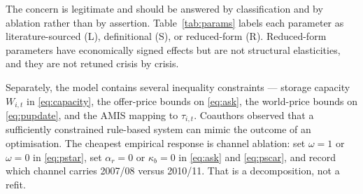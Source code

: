 The concern is legitimate and should be answered by classification and by
ablation rather than by assertion. Table~\ref{tab:params} labels each
parameter as literature-sourced (L), definitional (S), or reduced-form
(R). Reduced-form parameters have economically signed effects but are not
structural elasticities, and they are not retuned crisis by crisis.

Separately, the model contains several inequality constraints --- storage
capacity \(W_{i,t}\) in \eqref{eq:capacity}, the offer-price bounds on
\eqref{eq:ask}, the world-price bounds on \eqref{eq:pupdate}, and the AMIS
mapping to \(\tau_{i,t}\). Coauthors observed that a sufficiently
constrained rule-based system can mimic the outcome of an optimisation.
The cheapest empirical response is channel ablation: set \(\omega=1\) or
\(\omega=0\) in \eqref{eq:pstar}, set \(\alpha_r=0\) or \(\kappa_b=0\) in
\eqref{eq:ask} and \eqref{eq:pscar}, and record which channel carries
2007/08 versus 2010/11. That is a decomposition, not a refit.
